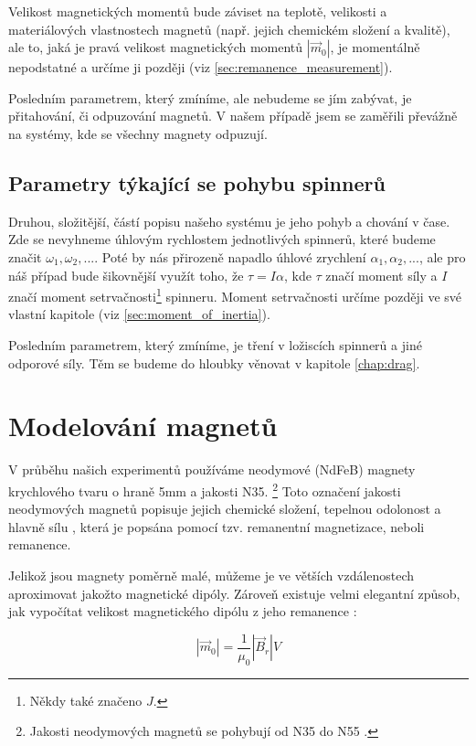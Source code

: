\documentclass[12pt, a4paper,
 twoside,        %
 openright
]{report}
\begin{document}
Velikost magnetických momentů bude záviset na teplotě, velikosti a materiálových vlastnostech magnetů (např. jejich chemickém složení a kvalitě), ale to, jaká je pravá velikost magnetických momentů $|\vec{m}_0|$, je momentálně nepodstatné a určíme ji později (viz \autoref{sec:remanence_measurement}).

Posledním parametrem, který zmíníme, ale nebudeme se jím zabývat, je přitahování, či odpuzování magnetů.
V našem případě jsem se zaměřili převážně na systémy, kde se všechny magnety odpuzují.

\subsection{Parametry týkající se pohybu spinnerů}
\label{sub:param_move}

Druhou, složitější, částí popisu našeho systému je jeho pohyb a chování v čase.
Zde se nevyhneme úhlovým rychlostem jednotlivých spinnerů, které budeme značit $\omega_1, \omega_2,...$.
Poté by nás přirozeně napadlo úhlové zrychlení $\alpha_1, \alpha_2, ...$, ale pro náš případ bude šikovnější využít toho, že $\tau = I\alpha$, kde $\tau$ značí moment síly a $I$ značí moment setrvačnosti\footnote{Někdy také značeno $J$.} spinneru.
Moment setrvačnosti určíme později ve své vlastní kapitole (viz \autoref{sec:moment_of_inertia}).

Posledním parametrem, který zmíníme, je tření v ložiscích spinnerů a jiné odporové síly.
Těm se budeme do hloubky věnovat v kapitole \ref{chap:drag}.

\clearpage

\section{Modelování magnetů}
V průběhu našich experimentů používáme neodymové (NdFeB) magnety krychlového tvaru o hraně 5mm a jakosti N35. \footnote{Jakosti neodymových magnetů se pohybují od N35 do N55 \cite{magnet_grades}.}
Toto označení jakosti neodymových magnetů popisuje jejich chemické složení, tepelnou odolonost a hlavně sílu \cite{magnet_grades}, která je popsána pomocí tzv. remanentní magnetizace, neboli remanence.

Jelikož jsou magnety poměrně malé, můžeme je ve větších vzdálenostech aproximovat jakožto magnetické dipóly.
Zároveň existuje velmi elegantní způsob, jak vypočítat velikost magnetického dipólu z jeho remanence \cite{magnetic_torque}:

\begin{equation}
    \label{eq:mag_mom_remanence}
    |\vec{m}_0| = \frac{1}{\mu_0}|\vec{B}_r|V
\end{equation}
\end{document}

